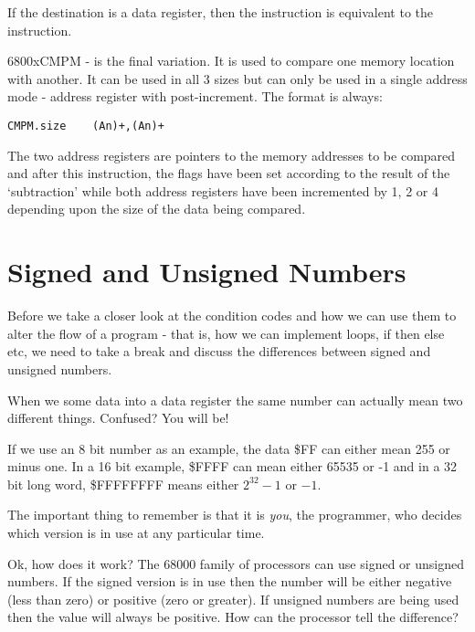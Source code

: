If the destination is a data register, then the instruction is
    equivalent to the  instruction.

\mc6800x{CMPM} -{} is the final variation. It is used to compare one memory
    location with another. It can be used in all 3 sizes but can only be used
    in a single address mode -{} address register with post-increment. The format
    is always:

\begin{lstlisting}[firstnumber=1,]
          CMPM.size    (An)+,(An)+
\end{lstlisting}

The two address registers are pointers to the memory addresses to be
    compared and after this instruction, the flags have been set according to
    the result of the `subtraction' while both address registers have been
    incremented by 1, 2 or 4 depending upon the size of the data being
    compared.

\section{Signed and Unsigned Numbers}
\label{ch2-signed-unsinged}%

Before we take a closer look at the condition codes and how we can
    use them to alter the flow of a program -{} that is, how we can implement
    loops, if then else etc, we need to take a break and discuss the
    differences between signed and unsigned numbers.

When we  some data into a data register the same number can
    actually mean two different things. Confused? You will be!

If we use an 8 bit number as an example, the data \$FF can either
    mean 255 or minus one. In a 16 bit example, \$FFFF can mean either 65535 or -{}1 and
    in a 32 bit long word, \$FFFFFFFF means either $2^{32}-1$ or $-{}1$. 
    
The important thing to
    remember is that it is \emph{you}, the programmer, who decides which version is
    in use at any particular time.

Ok, how does it work? The 68000 family of processors can use signed
    or unsigned numbers. If the signed version is in use then the number will
    be either negative (less than zero) or positive (zero or greater). If
    unsigned numbers are being used then the value will always be positive.
    How can the processor tell the difference?

